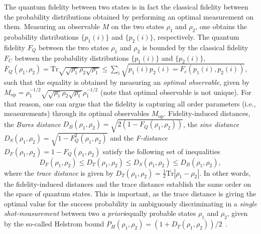 The quantum fidelity between two states is in fact the classical fidelity between the probability distributions obtained by performing an optimal measurement on them. Measuring an observable $M$ on the two states $\rho_1$ and $\rho_2$, one obtains the probability distributions $\{p_1(i)\}$ and $\{p_2(i)\}$, respectively. The quantum fidelity $F_Q$ between the two states $\rho_1$ and $\rho_2$ is bounded by the classical fidelity $F_C$ between the probability distributions $\{p_1(i)\}$ and $\{p_2(i)\}$, $F_Q (\rho_1,\rho_2) = \mbox{Tr}\sqrt{\sqrt{\rho_1}\rho_2\sqrt{\rho_1}} \leq \sum_i \sqrt{p_1(i)p_2(i) = F_c (p_1(i),p_2(i))}$, such that the equality is obtained by measuring an {\em optimal observable}, given by $M_{\text{op}} = \rho_1^{-1/2}\sqrt{\sqrt{\rho_1}\rho_2\sqrt{\rho_1}} \rho_1^{-1/2}$ (note that optimal observable is not unique). For that reason, one can argue that the fidelity is capturing all order parameters (i.e., measurements) through its optimal observables $M_{\text{op}}$. Fidelity-induced distances, the {\em Bures distance} $D_B(\rho_1,\rho_2) = \sqrt{2(1-F_Q(\rho_1,\rho_2))}$, the {\em sine distance} $D_S(\rho_1,\rho_2) = \sqrt{1-F_Q^2(\rho_1,\rho_2)}$ and the {\em F-distance} $D_F(\rho_1,\rho_2) = 1-F_Q(\rho_1,\rho_2)$ satisfy the following set of inequalities
\begin{equation*}
	 D_F(\rho_1,\rho_2) \leq D_T(\rho_1,\rho_2) \leq D_S(\rho_1,\rho_2) \leq D_B(\rho_1,\rho_2),
\end{equation*}
where the {\em trace distance} is given by $D_T(\rho_1,\rho_2) = \frac{1}{2} \mbox{Tr}|\rho_1 - \rho_2|$. In other words, the fidelity-induced distances and the trace distance establish the same order on the space of quantum states. This is important, as the trace distance is giving the optimal value for the success probability in ambiguously discriminating in a {\em single shot-measurement} between two {\em a priori}equally probable states $\rho_1$ and $\rho_2$, given by the so-called Helstrom bound $P_H (\rho_1,\rho_2) = (1 + D_T (\rho_1,\rho_2))/2$~\cite{hel:76}.

